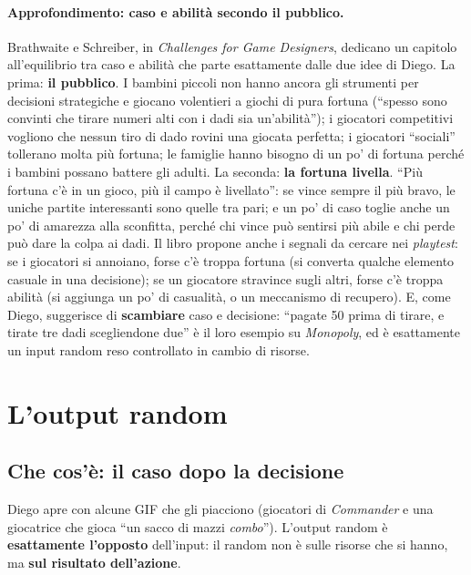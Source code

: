 \paragraph{Approfondimento: caso e abilità secondo il pubblico.} Brathwaite e Schreiber, in
\emph{Challenges for Game Designers}, dedicano un capitolo all'equilibrio tra caso e
abilità che parte esattamente dalle due idee di Diego. La prima: \textbf{il pubblico}. I
bambini piccoli non hanno ancora gli strumenti per decisioni strategiche e giocano volentieri
a giochi di pura fortuna (``spesso sono convinti che tirare numeri alti con i dadi sia
un'abilità''); i giocatori competitivi vogliono che nessun tiro di dado rovini una giocata
perfetta; i giocatori ``sociali'' tollerano molta più fortuna; le famiglie hanno bisogno di
un po' di fortuna perché i bambini possano battere gli adulti. La seconda: \textbf{la fortuna
livella}. ``Più fortuna c'è in un gioco, più il campo è livellato'': se vince sempre il più
bravo, le uniche partite interessanti sono quelle tra pari; e un po' di caso toglie anche un
po' di amarezza alla sconfitta, perché chi vince può sentirsi più abile e chi perde può
dare la colpa ai dadi. Il libro propone anche i segnali da cercare nei \emph{playtest}: se
i giocatori si annoiano, forse c'è troppa fortuna (si converta qualche elemento casuale in
una decisione); se un giocatore stravince sugli altri, forse c'è troppa abilità (si aggiunga
un po' di casualità, o un meccanismo di recupero). E, come Diego, suggerisce di
\textbf{scambiare} caso e decisione: ``pagate 50 prima di tirare, e tirate tre dadi
scegliendone due'' è il loro esempio su \emph{Monopoly}, ed è esattamente un input random
reso controllato in cambio di risorse.

\section{L'output random}
\label{a15:sec:output}

\subsection{Che cos'è: il caso dopo la decisione}

Diego apre con alcune GIF che gli piacciono (giocatori di \emph{Commander} e una giocatrice
che gioca ``un sacco di mazzi \emph{combo}''). L'output random è \textbf{esattamente
l'opposto} dell'input: il random non è sulle risorse che si hanno, ma \textbf{sul risultato
dell'azione}.

